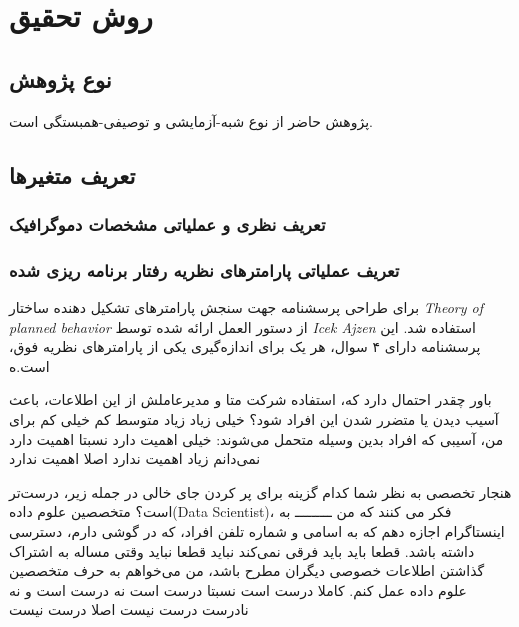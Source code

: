 \chapter{روش تحقیق}
\section{نوع پژوهش}
پژوهش حاضر از نوع شبه-آزمایشی و توصیفی-همبستگی است. 
\section{تعریف متغیر‌ها}

\subsection{تعریف نظری و عملیاتی مشخصات دموگرافیک}


\subsection{تعریف عملیاتی پارامترهای
     نظریه رفتار برنامه ریزی شده    
}

برای طراحی پرسشنامه جهت سنجش پارامتر‌های تشکیل دهنده ساختار
\textit{\gls{Theory of planned behavior}}
از دستور العمل ارائه شده توسط
\textit{\gls{Icek Ajzen}}
\!\citep{IcekAjzenHomepage}
استفاده شد. این پرسشنامه دارای ۴ سوال، هر یک برای اندازه‌گیری
یکی از پارامترهای نظریه فوق، است.ه

باور
چقدر احتمال دارد که، استفاده شرکت متا و مدیر‌عاملش از این اطلاعات، باعث آسیب‌ دیدن یا متضرر شدن این افراد شود؟ 
خیلی زیاد
زیاد
متوسط
کم
خیلی کم
برای من، آسیبی که افراد بدین وسیله متحمل می‌شوند: 
خیلی اهمیت دارد
نسبتا اهمیت دارد
نمی‌دانم
زیاد اهمیت ندارد
اصلا اهمیت ندارد

هنجار تخصصی
به نظر شما کدام گزینه برای پر کردن جای خالی در جمله زیر، درست‌تر است؟
متخصصین علوم داده(Data Scientist)، فکر می کنند که من ـــــــــ به اینستاگرام اجازه دهم که به اسامی و شماره تلفن‌ افراد، که در گوشی دارم، دسترسی داشته باشد. 
قطعا باید
باید
فرقی نمی‌کند
نباید
قطعا نباید
وقتی مساله به اشتراک گذاشتن اطلاعات خصوصی دیگران مطرح باشد، من می‌خواهم به حرف متخصصین علوم داده عمل کنم. 
کاملا درست است
نسبتا درست است
نه درست است و نه نادرست
درست نیست
اصلا درست نیست


